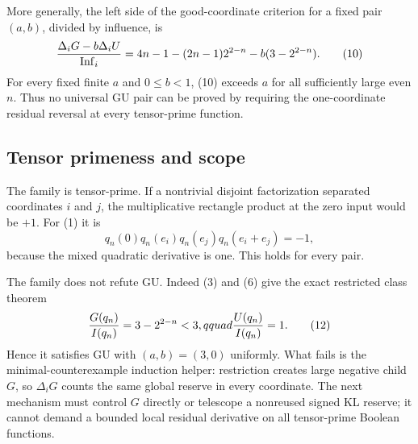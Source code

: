More generally, the left side of the good-coordinate criterion for a fixed
pair $(a,b)$, divided by influence, is
\[
 {\Delta_iG-b\Delta_iU\over\operatorname{Inf}_i}
 =4n-1-(2n-1)2^{2-n}-b(3-2^{2-n}).                    \tag{10}
\]
For every fixed finite $a$ and $0\le b<1$, (10) exceeds $a$ for all
sufficiently large even $n$.  Thus no universal GU pair can be proved by
requiring the one-coordinate residual reversal at every tensor-prime
function.

\subsection*{Tensor primeness and scope}

The family is tensor-prime.  If a nontrivial disjoint factorization separated
coordinates $i$ and $j$, the multiplicative rectangle product at the zero
input would be $+1$.  For (1) it is
\[
 q_n(0)q_n(e_i)q_n(e_j)q_n(e_i+e_j)=-1,               \tag{11}
\]
because the mixed quadratic derivative is one.  This holds for every pair.

The family does not refute GU.  Indeed (3) and (6) give the exact restricted
class theorem
\[
 {G(q_n)\over I(q_n)}=3-2^{2-n}<3,qquad
 {U(q_n)\over I(q_n)}=1.                              \tag{12}
\]
Hence it satisfies GU with $(a,b)=(3,0)$ uniformly.  What fails is the
minimal-counterexample induction helper: restriction creates large negative
child $G$, so $\Delta_iG$ counts the same global reserve in every coordinate.
The next mechanism must control $G$ directly or telescope a nonreused signed
KL reserve; it cannot demand a bounded local residual derivative on all
tensor-prime Boolean functions.

